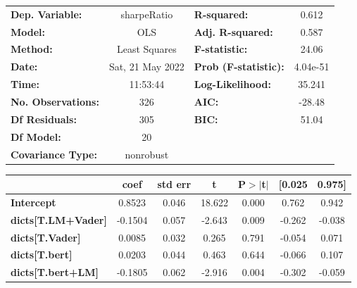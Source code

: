 \begin{center}
\begin{tabular}{lclc}
\toprule
\textbf{Dep. Variable:}              &   sharpeRatio    & \textbf{  R-squared:         } &     0.612   \\
\textbf{Model:}                      &       OLS        & \textbf{  Adj. R-squared:    } &     0.587   \\
\textbf{Method:}                     &  Least Squares   & \textbf{  F-statistic:       } &     24.06   \\
\textbf{Date:}                       & Sat, 21 May 2022 & \textbf{  Prob (F-statistic):} &  4.04e-51   \\
\textbf{Time:}                       &     11:53:44     & \textbf{  Log-Likelihood:    } &    35.241   \\
\textbf{No. Observations:}           &         326      & \textbf{  AIC:               } &    -28.48   \\
\textbf{Df Residuals:}               &         305      & \textbf{  BIC:               } &     51.04   \\
\textbf{Df Model:}                   &          20      & \textbf{                     } &             \\
\textbf{Covariance Type:}            &    nonrobust     & \textbf{                     } &             \\
\bottomrule
\end{tabular}
\begin{tabular}{lcccccc}
                                     & \textbf{coef} & \textbf{std err} & \textbf{t} & \textbf{P$> |$t$|$} & \textbf{[0.025} & \textbf{0.975]}  \\
\midrule
\textbf{Intercept}                   &       0.8523  &        0.046     &    18.622  &         0.000        &        0.762    &        0.942     \\
\textbf{dicts[T.LM+Vader]}           &      -0.1504  &        0.057     &    -2.643  &         0.009        &       -0.262    &       -0.038     \\
\textbf{dicts[T.Vader]}              &       0.0085  &        0.032     &     0.265  &         0.791        &       -0.054    &        0.071     \\
\textbf{dicts[T.bert]}               &       0.0203  &        0.044     &     0.463  &         0.644        &       -0.066    &        0.107     \\
\textbf{dicts[T.bert+LM]}            &      -0.1805  &        0.062     &    -2.916  &         0.004        &       -0.302    &       -0.059     \\

\end{tabular}
\end{center}
